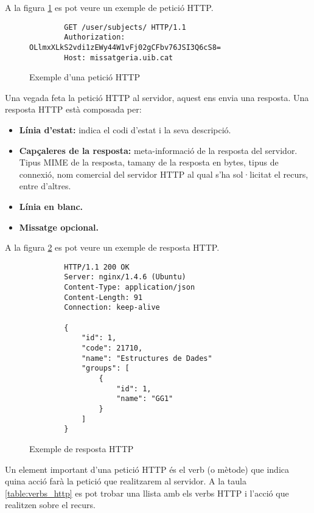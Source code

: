A la figura \ref{fig:exemple_peticio_http} es pot veure un exemple de petició \ac{HTTP}.

\begin{figure}[h!]
	\begin{verbatim}
		GET /user/subjects/ HTTP/1.1
		Authorization: OLlmxXLkS2vdi1zEWy44W1vFj02gCFbv76JSI3Q6cS8=
		Host: missatgeria.uib.cat
	\end{verbatim}
\caption{Exemple d'una petició \ac{HTTP}}
\label{fig:exemple_peticio_http}
\end{figure}

Una vegada feta la petició \ac{HTTP} al servidor, aquest ens envia una resposta. Una resposta \ac{HTTP} està composada per:

\begin{itemize}
	\item \textbf{Línia d'estat:} indica el codi d'estat i la seva descripció.
	\item \textbf{Capçaleres de la resposta:} meta-informació de la resposta del servidor. Tipus \ac{MIME} de la resposta, tamany de la resposta en bytes, tipus de connexió, nom comercial del servidor \ac{HTTP} al qual s'ha sol·licitat el recurs, entre d'altres.
	\item \textbf{Línia en blanc.}
	\item \textbf{Missatge opcional.}
\end{itemize}

A la figura \ref{fig:exemple_resposta_http} es pot veure un exemple de resposta \ac{HTTP}.\\

\begin{figure}[h!]
	\begin{verbatim}
		HTTP/1.1 200 OK
		Server: nginx/1.4.6 (Ubuntu)
		Content-Type: application/json
		Content-Length: 91
		Connection: keep-alive
		
  		{
   			"id": 1,
   			"code": 21710,
   			"name": "Estructures de Dades"
    		"groups": [
      			{
        			"id": 1,
        			"name": "GG1"
     			}
    		]
   		}
  	\end{verbatim}
  	\caption{Exemple de resposta \ac{HTTP}}
  	\label{fig:exemple_resposta_http}
 \end{figure}
 
Un element important d'una petició \ac{HTTP} és el verb (o mètode) que indica quina acció farà la petició que realitzarem al servidor. A la taula \ref{table:verbs_http} es pot trobar una llista amb els verbs \ac{HTTP} i l'acció que realitzen sobre el recurs.

